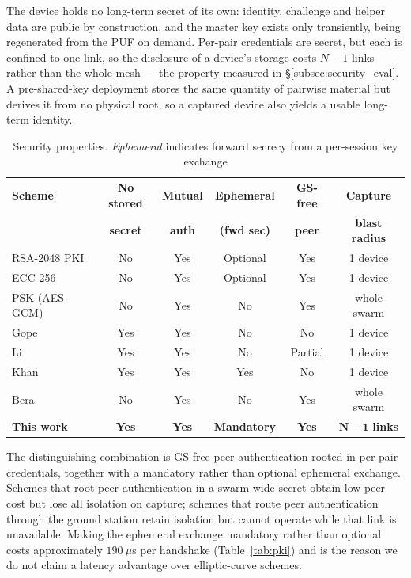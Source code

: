 \documentclass[11pt,a4paper]{article}
\begin{document}
The device holds no long-term secret of its own: identity, challenge and helper
data are public by construction, and the master key exists only transiently, being
regenerated from the PUF on demand. Per-pair credentials are secret, but each is
confined to one link, so the disclosure of a device's storage costs $N-1$ links
rather than the whole mesh --- the property measured in
\S\ref{subsec:security_eval}. A pre-shared-key deployment stores the same quantity
of pairwise material but derives it from no physical root, so a captured device
also yields a usable long-term identity.

\begin{table}[H]
\centering
\caption{Security properties. \emph{Ephemeral} indicates forward secrecy from a
per-session key exchange}
\label{tab:cmp_security}
\small
\begin{tabular}{@{}p{2.9cm}ccccc@{}}
\toprule
\textbf{Scheme} & \textbf{No stored} & \textbf{Mutual} & \textbf{Ephemeral} &
\textbf{GS-free} & \textbf{Capture} \\
 & \textbf{secret} & \textbf{auth} & \textbf{(fwd sec)} & \textbf{peer} &
\textbf{blast radius} \\
\midrule
RSA-2048 PKI & No & Yes & Optional & Yes & 1 device \\
ECC-256 & No & Yes & Optional & Yes & 1 device \\
PSK (AES-GCM) & No & Yes & No & Yes & whole swarm \\
Gope~\cite{puf_lightweight_uav} & Yes & Yes & No & No & 1 device \\
Li~\cite{puf_uav_cross_domain} & Yes & Yes & No & Partial & 1 device \\
Khan~\cite{puf_6g_uav} & Yes & Yes & Yes & No & 1 device \\
Bera~\cite{peer2peer_auth} & No & Yes & No & Yes & whole swarm \\
\midrule
\textbf{This work} & \textbf{Yes} & \textbf{Yes} & \textbf{Mandatory} &
\textbf{Yes} & $\mathbf{N-1}$ \textbf{links} \\
\bottomrule
\end{tabular}
\normalsize
\end{table}

The distinguishing combination is GS-free peer authentication rooted in per-pair
credentials, together with a mandatory rather than optional ephemeral exchange.
Schemes that root peer authentication in a swarm-wide secret obtain low peer cost
but lose all isolation on capture; schemes that route peer authentication through
the ground station retain isolation but cannot operate while that link is
unavailable. Making the ephemeral exchange mandatory rather than optional costs
approximately $190~\mu$s per handshake (Table~\ref{tab:pki}) and is the reason we
do not claim a latency advantage over elliptic-curve schemes.
\end{document}
